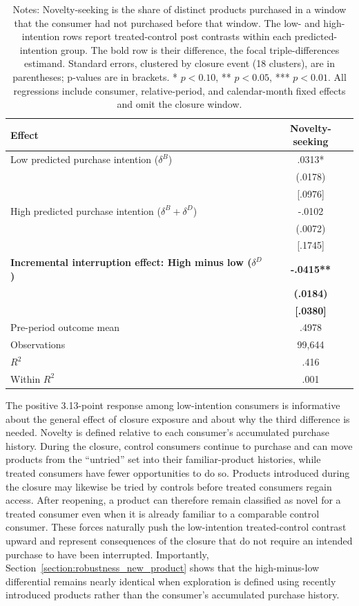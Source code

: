 \documentclass[11 pt]{article}
\newcommand\fnote[1]{\captionsetup{font=footnotesize}\caption*{#1}}
\begin{document}
\begin{table}[h!]
\centering
\caption{Purchase interruption narrows subsequent novelty-seeking}
\label{tab:main_results_decomposition}
\small
\begin{tabularx}{0.82\textwidth}{Xc}
\toprule
Effect & Novelty-seeking \\
\midrule
Low predicted purchase intention ($\delta^B$) & .0313* \\
 & (.0178) \\
 & [.0976] \\
High predicted purchase intention ($\delta^B+\delta^D$) & -.0102 \\
 & (.0072) \\
 & [.1745] \\
\addlinespace
\textbf{Incremental interruption effect: High minus low ($\delta^D$)} & \textbf{-.0415**} \\
 & \textbf{(.0184)} \\
 & \textbf{[.0380]} \\
\addlinespace
Pre-period outcome mean & .4978 \\
Observations & 99,644 \\
$R^2$ & .416 \\
Within $R^2$ & .001 \\
\bottomrule
\end{tabularx}
\vspace{1mm}
\fnote{Notes: Novelty-seeking is the share of distinct products purchased in a window that the consumer had not purchased before that window. The low- and high-intention rows report treated-control post contrasts within each predicted-intention group. The bold row is their difference, the focal triple-differences estimand. Standard errors, clustered by closure event (18 clusters), are in parentheses; p-values are in brackets. * $p<0.10$, ** $p<0.05$, *** $p<0.01$. All regressions include consumer, relative-period, and calendar-month fixed effects and omit the closure window.}
\end{table}

The positive 3.13-point response among low-intention consumers is informative about the general effect of closure exposure and about why the third difference is needed. Novelty is defined relative to each consumer's accumulated purchase history. During the closure, control consumers continue to purchase and can move products from the ``untried'' set into their familiar-product histories, while treated consumers have fewer opportunities to do so. Products introduced during the closure may likewise be tried by controls before treated consumers regain access. After reopening, a product can therefore remain classified as novel for a treated consumer even when it is already familiar to a comparable control consumer. These forces naturally push the low-intention treated-control contrast upward and represent consequences of the closure that do not require an intended purchase to have been interrupted. Importantly, Section~\ref{section:robustness_new_product} shows that the high-minus-low differential remains nearly identical when exploration is defined using recently introduced products rather than the consumer's accumulated purchase history.
\end{document}
